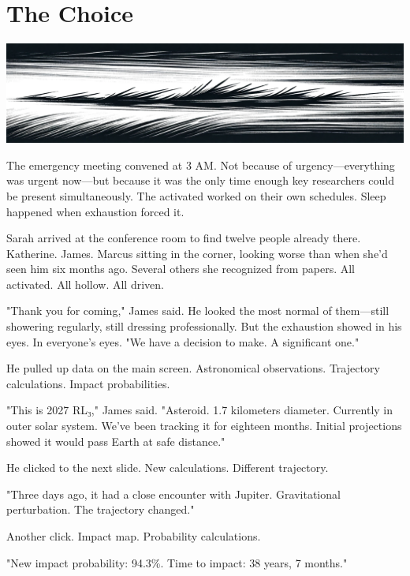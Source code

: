 \chapter{The Choice}
\label{ch:24}



\begin{center}
\includegraphics[width=\textwidth]{images/chapterImages/genesis_sketch_00121_.png}
\end{center}

The emergency meeting convened at 3 AM. Not because of urgency—everything was urgent now—but because it was the only time enough key researchers could be present simultaneously. The activated worked on their own schedules. Sleep happened when exhaustion forced it.

Sarah arrived at the conference room to find twelve people already there. Katherine. James. Marcus sitting in the corner, looking worse than when she'd seen him six months ago. Several others she recognized from papers. All activated. All hollow. All driven.

"Thank you for coming," James said. He looked the most normal of them—still showering regularly, still dressing professionally. But the exhaustion showed in his eyes. In everyone's eyes. "We have a decision to make. A significant one."

He pulled up data on the main screen. Astronomical observations. Trajectory calculations. Impact probabilities.

"This is 2027 RL₃," James said. "Asteroid. 1.7 kilometers diameter. Currently in outer solar system. We've been tracking it for eighteen months. Initial projections showed it would pass Earth at safe distance."

He clicked to the next slide. New calculations. Different trajectory.

"Three days ago, it had a close encounter with Jupiter. Gravitational perturbation. The trajectory changed."

Another click. Impact map. Probability calculations.

"New impact probability: 94.3\%. Time to impact: 38 years, 7 months."

